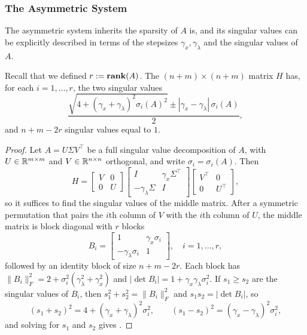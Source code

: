 \documentclass[11pt]{article}
\begin{document}
\subsubsection{The Asymmetric System}
The asymmetric system inherits the sparsity of $A$ is, and its singular values can be explicitly described in terms of the stepsizes $\gamma_x,\gamma_\lambda$ and the singular values of $A$.
\begin{lemma}\label{lem:singular-values-H}
    Recall that we defined $r := \mathop{\bf rank}(A)$.
    The $(n+m)\times(n+m)$ matrix $H$ has, for each $i = 1, \ldots, r$, the two singular values
    \begin{equation}\label{eq:singular-values-H}
        \frac{\sqrt{4 + (\gamma_x+\gamma_\lambda)^2\sigma_i(A)^2} \pm |\gamma_x-\gamma_\lambda|\,\sigma_i(A)}{2},
    \end{equation}
    and $n + m - 2r$ singular values equal to $1$.
\end{lemma}
\begin{proof}
    Let $A = U\Sigma V^\top$ be a full singular value decomposition of $A$, with $U \in \mathbb{R}^{m \times m}$ and $V \in \mathbb{R}^{n\times n}$ orthogonal, and write $\sigma_i = \sigma_i(A)$.
    Then
    \begin{equation*}
        H = \begin{bmatrix}
                V & 0 \\ 0 & U
        \end{bmatrix}\begin{bmatrix}
                I & \gamma_x \Sigma^\top \\ -\gamma_\lambda \Sigma & I
        \end{bmatrix}\begin{bmatrix}
                V^\top & 0 \\ 0 & U^\top
        \end{bmatrix},
    \end{equation*}
    so it suffices to find the singular values of the middle matrix.
    After a symmetric permutation that pairs the $i$th column of $V$ with the $i$th column of $U$, the middle matrix is block diagonal with $r$ blocks
    \begin{equation*}
        B_i = \begin{bmatrix}
            1 & \gamma_x \sigma_i \\
            -\gamma_\lambda \sigma_i & 1
        \end{bmatrix}, \quad i = 1, \ldots, r,
    \end{equation*}
    followed by an identity block of size $n + m - 2r$.
    Each block has $\|B_i\|_F^2 = 2 + \sigma_i^2(\gamma_\lambda^2 + \gamma_x^2)$ and $|\det B_i| = 1 + \gamma_x\gamma_\lambda \sigma_i^2$.
    If $s_1 \geq s_2$ are the singular values of $B_i$, then $s_1^2 + s_2^2 = \|B_i\|_F^2$ and $s_1 s_2 = |\det B_i|$, so
    \begin{equation*}
        (s_1+s_2)^2 = 4 + (\gamma_x+\gamma_\lambda)^2\sigma_i^2,
        \qquad
        (s_1-s_2)^2 = (\gamma_x-\gamma_\lambda)^2\sigma_i^2,
    \end{equation*}
    and solving for $s_1$ and $s_2$ gives .
\end{proof}
\end{document}
